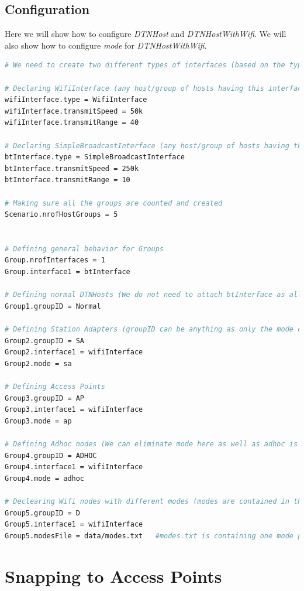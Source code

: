 \subsection{Configuration}
Here we will show how to configure \textit{DTNHost} and \textit{DTNHostWithWifi}. We will also show how to configure \textit{mode} for \textit{DTNHostWithWifi}.

\begin{lstlisting}[language=bash]
# We need to create two different types of interfaces (based on the types of interface, either DTNHost or DTNHostWithWifi object is created)

# Declaring WifiInterface (any host/group of hosts having this interface will be the DTNHostWithWifi hosts)
wifiInterface.type = WifiInterface
wifiInterface.transmitSpeed = 50k
wifiInterface.transmitRange = 40

# Declaring SimpleBroadcastInterface (any host/group of hosts having this interface will be the DTNHost hosts)
btInterface.type = SimpleBroadcastInterface
btInterface.transmitSpeed = 250k
btInterface.transmitRange = 10

# Making sure all the groups are counted and created
Scenario.nrofHostGroups = 5


# Defining general behavior for Groups
Group.nrofInterfaces = 1
Group.interface1 = btInterface

# Defining normal DTNHosts (We do not need to attach btInterface as all the groups would have the btInterface by default)
Group1.groupID = Normal

# Defining Station Adapters (groupID can be anything as only the mode can identify between different types of hosts)
Group2.groupID = SA
Group2.interface1 = wifiInterface
Group2.mode = sa

# Defining Access Points
Group3.groupID = AP
Group3.interface1 = wifiInterface
Group3.mode = ap

# Defining Adhoc nodes (We can eliminate mode here as well as adhoc is the default mode)
Group4.groupID = ADHOC
Group4.interface1 = wifiInterface
Group4.mode = adhoc

# Declearing Wifi nodes with different modes (modes are contained in the modesFile)
Group5.groupID = D
Group5.interface1 = wifiInterface
Group5.modesFile = data/modes.txt   #modes.txt is containing one mode per line. The mode is applied to the hosts in the same order

\end{lstlisting}
\newpage
\section{Snapping to Access Points}
